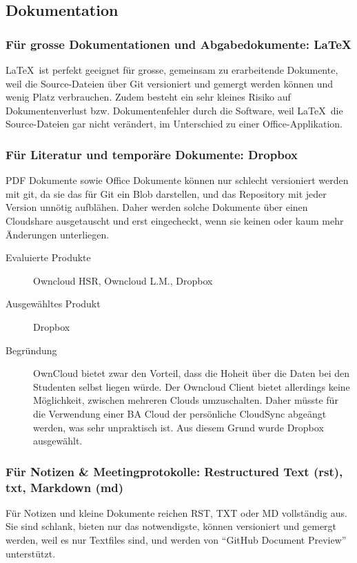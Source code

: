 		\subsection{Dokumentation}
			\subsubsection{Für grosse Dokumentationen und Abgabedokumente: \LaTeX}
				\LaTeX\ ist perfekt geeignet für grosse, gemeinsam zu erarbeitende Dokumente,
				weil die Source-Dateien über Git versioniert und gemergt werden können und wenig
				Platz verbrauchen. 
				Zudem besteht ein sehr kleines Risiko auf Dokumentenverlust
				bzw. Dokumentenfehler durch die Software, weil \LaTeX\ die Source-Dateien gar
				nicht verändert, im Unterschied zu einer Office-Applikation.
				
			\subsubsection{Für Literatur und temporäre Dokumente: Dropbox}
			PDF Dokumente sowie Office Dokumente können nur schlecht versioniert werden mit git, 
			da sie das für Git ein Blob darstellen, und das Repository mit jeder Version unnötig aufblähen.
			Daher werden solche Dokumente über einen Cloudshare ausgetauscht und erst eingecheckt, 
			wenn sie keinen oder kaum mehr Änderungen unterliegen.
				
				\begin{description}
					\item[Evaluierte Produkte] Owncloud HSR, Owncloud L.M., Dropbox
					\item[Ausgewähltes Produkt] Dropbox
					\item[Begründung] OwnCloud bietet zwar den Vorteil, dass die Hoheit über die Daten bei den Studenten selbst liegen würde.
						Der Owncloud Client bietet allerdings keine Möglichkeit, 
						zwischen mehreren Clouds umzuschalten. 
						Daher müsste für die Verwendung einer BA Cloud der persönliche CloudSync abgeängt werden, 
						was sehr unpraktisch ist.
						Aus diesem Grund wurde Dropbox ausgewählt.
				\end{description}

			\subsubsection{Für Notizen \& Meetingprotokolle: Restructured Text (rst), txt, Markdown (md)}
				Für Notizen und kleine Dokumente reichen RST, TXT oder MD vollständig aus. 
				Sie sind schlank, bieten nur das notwendigste, können versioniert und gemergt werden,
				weil es nur Textfiles sind, und werden von "`GitHub Document Preview"'	unterstützt.

